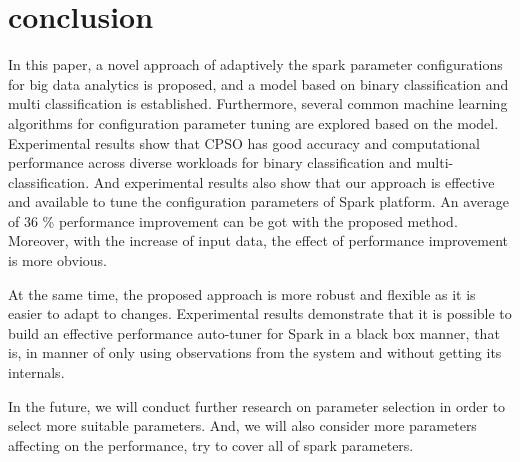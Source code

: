 \section{conclusion}
\par In this paper, a novel approach of adaptively the spark parameter configurations for big data analytics is proposed, and a model based on binary classification and multi classification is established. Furthermore, several common machine learning algorithms for configuration parameter tuning are explored based on the model. Experimental results show that CPSO has good accuracy and computational performance across diverse workloads for binary classification and multi-classification. And experimental results also show that our approach is effective and available to tune the configuration parameters of Spark platform. An average of 36
\% performance improvement can be got with the proposed method. Moreover, with the increase of input data, the effect of performance improvement is more obvious.
\par At the same time, the proposed approach is more robust and flexible as it is easier to adapt to changes. Experimental results demonstrate that it is possible to build an effective performance auto-tuner for Spark in a black box manner, that is, in manner of only using observations from the system and without getting its internals.
\par In the future, we will conduct further research on parameter selection in order to select more suitable parameters. And, we will also consider more parameters affecting on the performance,  try to cover all of spark parameters.
